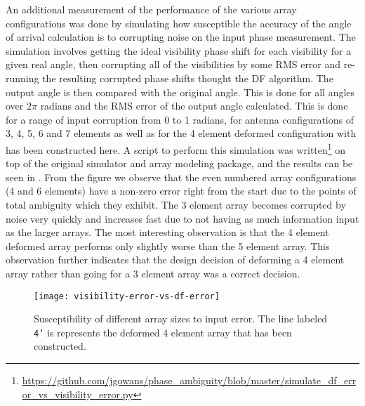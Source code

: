 An additional measurement of the performance of the various array configurations was done by simulating how susceptible the accuracy of the angle of arrival calculation is to corrupting noise on the input phase measurement. The simulation involves getting the ideal visibility phase shift for each visibility for a given real angle, then corrupting all of the visibilities by some RMS error and re-running the resulting corrupted phase shifts thought the DF algorithm. The output angle is then compared with the original angle. This is done for all angles over \(2\pi\) radians and the RMS error of the output angle calculated. This is done for a range of input corruption from 0 to 1 radians, for antenna configurations of 3, 4, 5, 6 and 7 elements as well as for the 4 element deformed configuration with has been constructed here. A script to perform this simulation was written\footnote{\url{https://github.com/jgowans/phase_ambiguity/blob/master/simulate_df_error_vs_visibility_error.py}} on top of the original simulator and array modeling package, and the results can be seen in . From the figure we observe that the even numbered array configurations (4 and 6 elements) have a non-zero error right from the start due to the points of total ambiguity which they exhibit. The 3 element array becomes corrupted by noise very quickly and increases fast due to not having as much information input as the larger arrays. The most interesting observation is that the 4 element deformed array performs only slightly worse than the 5 element array. This observation further indicates that the design decision of deforming a 4 element array rather than going for a 3 element array was a correct decision.

\begin{figure}
  \centering
  \texttt{[image: visibility-error-vs-df-error]}
  \caption{Susceptibility of different array sizes to input error. The line labeled \texttt{4'} is represents the deformed 4 element array that has been constructed.}
  \label{fig:antenna-array:configuration-vs-input-error-vs-output-error}
\end{figure}

